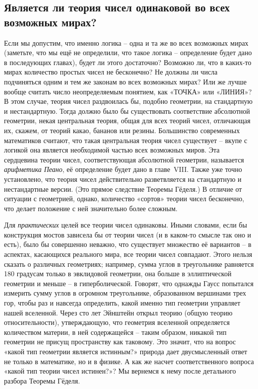 \documentclass[../main.tex]{subfiles}
\begin{document}
\subsection{Является ли теория чисел одинаковой во всех возможных мирах?}

Если мы допустим, что именно логика \--- одна и та же во всех возможных мирах (заметьте, что мы ещё не определили, что такое логика \--- определение будет дано в последующих главах), будет ли этого достаточно? Возможно ли, что в каких-то мирах количество простых чисел не бесконечно? Не должны ли числа подчиняться одним и тем же законам во всех возможных мирах? Или же лучше вообще считать число неопределяемым понятием, как «ТОЧКА» или «ЛИНИЯ»? В этом случае, теория чисел раздвоилась бы, подобно геометрии, на стандартную и нестандартную. Тогда должно было бы существовать соответствие абсолютной геометрии, некая центральная теория, общая для всех теорий чисел, отличающая их, скажем, от теорий какао, бананов или резины. Большинство современных математиков считают, что такая центральная теория чисел существует \--- вкупе с логикой она является необходимой частью всех возможных миров. Эта сердцевина теории чисел, соответствующая абсолютной геометрии, называется \emph{арифметика Пеано}, её определение будет дано в главе~VIII\@. Также уже точно установлено, что теория чисел действительно разветвляется на стандартную и нестандартные версии. (Это прямое следствие Теоремы Гёделя.) В отличие от ситуации с геометрией, однако, количество «сортов» теории чисел бесконечно, что делает положение с ней значительно более сложным.

Для \emph{практических} целей все теории чисел одинаковы. Иными словами, если бы конструкция мостов зависела бы от теории чисел (и в каком-то смысле так оно и есть), было бы совершенно неважно, что существует множество её вариантов \--- в аспектах, касающихся реального мира, все теории чисел совпадают. Этого нельзя сказать о различных геометриях; например, сумма углов в треугольнике равняется 180 градусам только в эвклидовой геометрии, она больше в эллиптической геометрии и меньше \--- в гиперболической. Говорят, что однажды Гаусс попытался измерить сумму углов в огромном треугольнике, образованном вершинами трех гор, чтобы раз и навсегда определить, какой именно тип геометрии управляет нашей вселенной. Через сто лет Эйнштейн открыл теорию (общую теорию относительности), утверждающую, что геометрия вселенной определяется количеством материи, в ней содержащейся \--- таким образом, никакой тип геометрии не присущ пространству как таковому. Это значит, что на вопрос «какой тип геометрии является истинным?» природа дает двусмысленный ответ не только в математике, но и в физике. А как же насчет соответственного вопроса «какой тип теории чисел истинен?»? Мы вернемся к нему после детального разбора Теоремы Гёделя.
\end{document}
